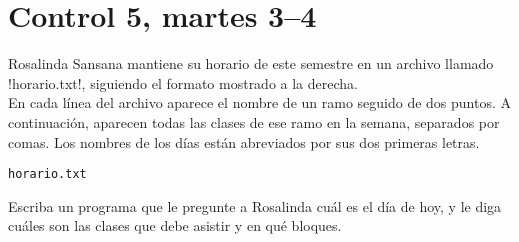 \documentclass[12pt,spanish,a5paper,landscape]{article}
\begin{document}
  \newpage

  \part*{Control 5, martes 3--4}
  \newpage

  \begin{minipage}[t]{0.48\textwidth}
    Rosalinda Sansana mantiene su horario de este semestre
    en un archivo llamado \li!horario.txt!,
    siguiendo el formato mostrado a la derecha.
    \\[2ex]
    En cada línea del archivo aparece el nombre de un ramo
    seguido de dos puntos.
    A continuación,
    aparecen todas las clases de ese ramo en la semana,
    separados por comas.
    Los nombres de los días están abreviados
    por sus dos primeras letras.
  \end{minipage}
  \hfill
  \begin{minipage}[t]{0.42\textwidth}
    \hfil\verb!horario.txt!\hfil
    
  \end{minipage}

  Escriba un programa que le pregunte a Rosalinda
  cuál es el día de hoy,
  y le diga cuáles son las clases que debe asistir
  y en qué bloques.

  \begin{minipage}[t]{0.6\textwidth}
    
  \end{minipage}
\end{document}
